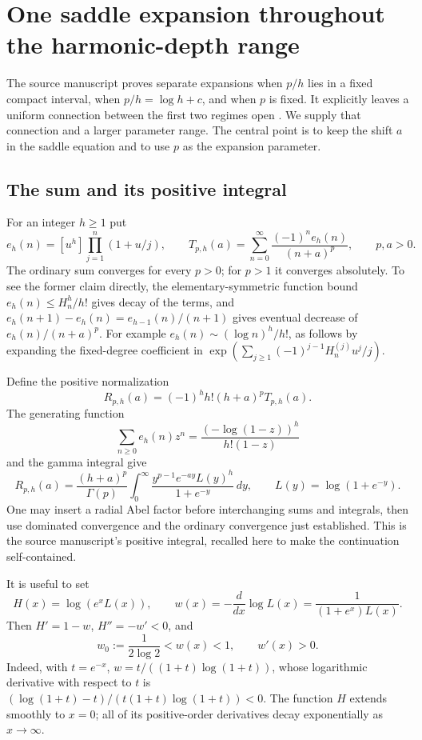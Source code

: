 \section{One saddle expansion throughout the harmonic-depth range}
\label{cont26:sec:uniform}

The source manuscript proves separate expansions when $p/h$ lies in a
fixed compact interval, when $p/h=\log h+c$, and when $p$ is fixed.
It explicitly leaves a uniform connection between the first two regimes
open \cite{ProveIt}. We supply that connection and a larger parameter
range. The central point is to keep the shift $a$ in the saddle equation
and to use $p$ as the expansion parameter.

\subsection{The sum and its positive integral}
For an integer $h\geq1$ put
\[
 e_h(n)=[u^h]\prod_{j=1}^n(1+u/j),\qquad
 T_{p,h}(a)=\sum_{n=0}^{\infty}\frac{(-1)^n e_h(n)}{(n+a)^p},
 \qquad p,a>0.
\]
The ordinary sum converges for every $p>0$; for $p>1$ it converges
absolutely. To see the former claim directly, the elementary-symmetric
function bound $e_h(n)\leq H_n^h/h!$ gives decay of the terms, and
$e_h(n+1)-e_h(n)=e_{h-1}(n)/(n+1)$ gives eventual decrease of
$e_h(n)/(n+a)^p$. For example $e_h(n)\sim(\log n)^h/h!$, as follows
by expanding the fixed-degree coefficient in
$\exp(\sum_{j\geq1}(-1)^{j-1}H_n^{(j)}u^j/j)$.

Define the positive normalization
\begin{equation}\label{cont26:eq:R}
 R_{p,h}(a)=(-1)^h h!(h+a)^pT_{p,h}(a).
\end{equation}
The generating function
\[
 \sum_{n\geq0}e_h(n)z^n
 =\frac{(-\log(1-z))^h}{h!(1-z)}
\]
and the gamma integral give
\begin{equation}\label{cont26:eq:positive}
 R_{p,h}(a)=\frac{(h+a)^p}{\Gamma(p)}
 \int_0^{\infty}\frac{y^{p-1}e^{-ay}L(y)^h}{1+e^{-y}}\,dy,
 \qquad L(y)=\log(1+e^{-y}).
\end{equation}
One may insert a radial Abel factor before interchanging sums and
integrals, then use dominated convergence and the ordinary convergence
just established. This is the source manuscript's positive integral,
recalled here to make the continuation self-contained.

It is useful to set
\begin{equation}\label{cont26:eq:H-w}
 H(x)=\log(e^xL(x)),\qquad
 w(x)=-\frac{d}{dx}\log L(x)
 =\frac1{(1+e^x)L(x)}.
\end{equation}
Then $H'=1-w$, $H''=-w'<0$, and
\begin{equation}\label{cont26:eq:w-bound}
 w_0:=\frac1{2\log2}<w(x)<1,\qquad w'(x)>0.
\end{equation}
Indeed, with $t=e^{-x}$,
$w=t/((1+t)\log(1+t))$, whose logarithmic derivative with respect
to $t$ is $(\log(1+t)-t)/(t(1+t)\log(1+t))<0$.
The function $H$ extends smoothly to $x=0$; all of its positive-order
derivatives decay exponentially as $x\to\infty$.

